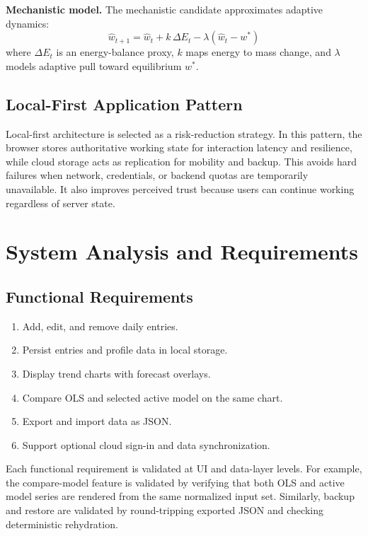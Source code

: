 \documentclass[12pt,a4paper]{report}
\begin{document}
\textbf{Mechanistic model.} The mechanistic candidate approximates adaptive dynamics:
\[
\hat{w}_{t+1}=\hat{w}_{t}+k\,\Delta E_t-\lambda(\hat{w}_{t}-w^*)
\]
where $\Delta E_t$ is an energy-balance proxy, $k$ maps energy to mass change, and $\lambda$ models adaptive pull toward equilibrium $w^*$.

\section{Local-First Application Pattern}
Local-first architecture is selected as a risk-reduction strategy. In this pattern, the browser stores authoritative working state for interaction latency and resilience, while cloud storage acts as replication for mobility and backup. This avoids hard failures when network, credentials, or backend quotas are temporarily unavailable. It also improves perceived trust because users can continue working regardless of server state.

\chapter{System Analysis and Requirements}
\section{Functional Requirements}
\begin{enumerate}[label=FR\arabic*]
  \item Add, edit, and remove daily entries.
  \item Persist entries and profile data in local storage.
  \item Display trend charts with forecast overlays.
  \item Compare OLS and selected active model on the same chart.
  \item Export and import data as JSON.
  \item Support optional cloud sign-in and data synchronization.
\end{enumerate}

Each functional requirement is validated at UI and data-layer levels. For example, the compare-model feature is validated by verifying that both OLS and active model series are rendered from the same normalized input set. Similarly, backup and restore are validated by round-tripping exported JSON and checking deterministic rehydration.
\end{document}
